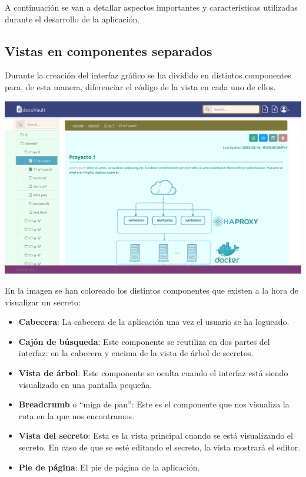 \documentclass{\ClassPath/viu-tfm-template}
\begin{document}
A continuación se van a detallar aspectos importantes y características utilizadas durante el desarrollo de la aplicación.


\subsection{Vistas en componentes separados}

Durante la creación del interfaz gráfico se ha dividido en distintos componentes para, de esta manera, diferenciar el código de la vista en cada uno de ellos.

\begin{center}
    \includegraphics[frame,width=\linewidth]{img/interfaz2-colored.png}
\end{center}

En la imagen se han coloreado los distintos componentes que existen a la hora de visualizar un secreto:

\begin{itemize}
    \item \textbf{Cabecera}: La cabecera de la aplicación una vez el usuario se ha logueado.
    \item \textbf{Cajón de búsqueda}: Este componente se reutiliza en dos partes del interfaz: en la cabecera y encima de la vista de árbol de secretos.
    \item \textbf{Vista de árbol}: Este componente se oculta cuando el interfaz está siendo visualizado en una pantalla pequeña.
    \item \textbf{Breadcrumb} o “miga de pan”: Este es el componente que nos visualiza la ruta en la que nos encontramos.
    \item \textbf{Vista del secreto}: Esta es la vista principal cuando se está visualizando el secreto. En caso de que se esté editando el secreto, la vista mostrará el editor.
    \item \textbf{Pie de página}: El pie de página de la aplicación.
\end{itemize}
\end{document}
